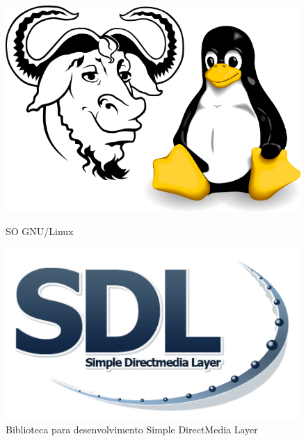 \documentclass[12pt]{article}
\begin{document}
\begin{figure}[!htb]
	\centering
		\begin{minipage}{0.5\textwidth}
		\centering
		\includegraphics[scale=0.15]{logo-gnu-linux.png}
		\caption{SO GNU/Linux}
		\label{GNU/Linux logo}
	\end{minipage}%
	\begin{minipage}{0.5\textwidth}
		\centering
		\includegraphics[scale=0.3]{logo-sdl.png}
		\caption{Biblioteca para desenvolvimento Simple DirectMedia Layer}
		\label{SDL logo}
	\end{minipage}
\end{figure}
\end{document}
